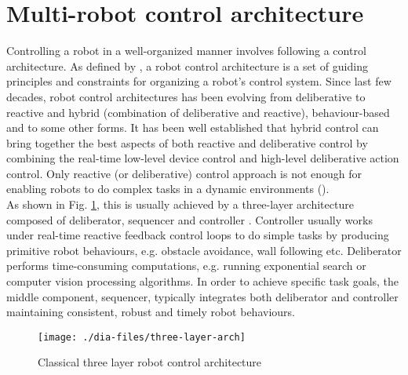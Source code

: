 \section{Multi-robot control architecture}
\label{expt-tools:arch}
Controlling a robot in a well-organized manner involves following a control architecture. As defined by \cite{Mataric2007}, a robot control architecture is a set of guiding principles and constraints for organizing a robot's control system. Since last few decades, robot control architectures has been evolving from deliberative to reactive and hybrid (combination of deliberative and reactive), behaviour-based and to some other forms. It has been well established that hybrid control can bring together the best aspects of both reactive and deliberative control by combining the real-time low-level device control and high-level deliberative action control. Only reactive (or deliberative) control approach is not enough for enabling robots to do complex tasks in a dynamic environments (\cite{Gat1997}).\\
 As shown in Fig. \ref{fig:three-layer-arch}, this is usually achieved by a three-layer architecture composed of deliberator, sequencer and controller . Controller usually works under real-time reactive feedback control loops to do simple tasks by producing primitive robot behaviours, e.g. obstacle avoidance, wall following etc. Deliberator performs time-consuming computations, e.g. running exponential search or computer vision processing algorithms. In order to achieve specific task goals, the middle component, sequencer, typically integrates both deliberator and controller maintaining consistent, robust and timely robot behaviours.\\
\begin{figure}
\begin{center}
\texttt{[image: ./dia-files/three-layer-arch]} %
\caption{Classical three layer robot control architecture } 
\label{fig:three-layer-arch}
\end{center}
\end{figure}
